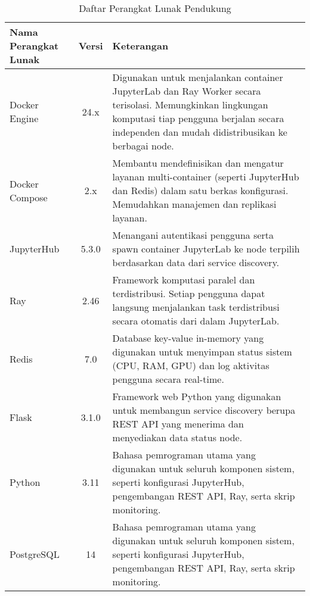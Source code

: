 \begin{table}[H]
  \centering
  \caption{Daftar Perangkat Lunak Pendukung}
  \label{tab:perangkat-lunak}
  \begin{tabularx}{\textwidth}{|l|c|X|}
    \hline
    \textbf{Nama Perangkat Lunak} & \textbf{Versi} & \textbf{Keterangan} \\ \hline

    Docker Engine & 24.x & Digunakan untuk menjalankan container JupyterLab dan Ray Worker secara terisolasi. Memungkinkan lingkungan komputasi tiap pengguna berjalan secara independen dan mudah didistribusikan ke berbagai node. \\ \hline

    Docker Compose & 2.x & Membantu mendefinisikan dan mengatur layanan multi-container (seperti JupyterHub dan Redis) dalam satu berkas konfigurasi. Memudahkan manajemen dan replikasi layanan. \\ \hline

    JupyterHub & 5.3.0 & Menangani autentikasi pengguna serta spawn container JupyterLab ke node terpilih berdasarkan data dari service discovery. \\ \hline

    Ray & 2.46 & Framework komputasi paralel dan terdistribusi. Setiap pengguna dapat langsung menjalankan task terdistribusi secara otomatis dari dalam JupyterLab. \\ \hline

    Redis & 7.0 & Database key-value in-memory yang digunakan untuk menyimpan status sistem (CPU, RAM, GPU) dan log aktivitas pengguna secara real-time. \\ \hline

    Flask & 3.1.0 & Framework web Python yang digunakan untuk membangun service discovery berupa REST API yang menerima dan menyediakan data status node. \\ \hline

    Python & 3.11 & Bahasa pemrograman utama yang digunakan untuk seluruh komponen sistem, seperti konfigurasi JupyterHub, pengembangan REST API, Ray, serta skrip monitoring. \\ \hline

   PostgreSQL & 14 & Bahasa pemrograman utama yang digunakan untuk seluruh komponen sistem, seperti konfigurasi JupyterHub, pengembangan REST API, Ray, serta skrip monitoring. \\ \hline
  \end{tabularx}
\end{table}

